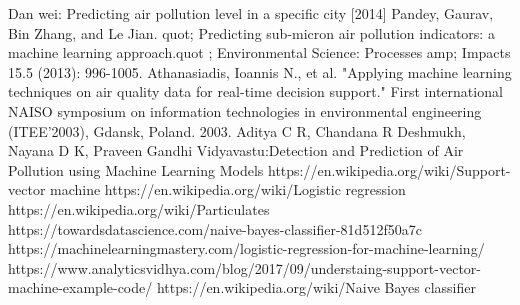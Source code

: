 \clearpage



\clearpage
{}
\begin{thebibliography}{99}
	
Dan wei: Predicting air pollution level in a specific city [2014]
Pandey, Gaurav, Bin Zhang, and Le Jian. quot; Predicting sub-micron air pollution indicators: a machine learning approach.quot ; Environmental Science: Processes  amp; Impacts 15.5 (2013): 996-1005.
Athanasiadis, Ioannis N., et al. "Applying machine learning techniques on air quality data for real-time decision support." First international NAISO symposium on information technologies in environmental engineering (ITEE'2003), Gdansk, Poland. 2003.
Aditya C R, Chandana R Deshmukh, Nayana D K, Praveen Gandhi Vidyavastu:Detection and Prediction of Air Pollution using Machine Learning Models
https://en.wikipedia.org/wiki/Support-vector machine
https://en.wikipedia.org/wiki/Logistic regression
https://en.wikipedia.org/wiki/Particulates
https://towardsdatascience.com/naive-bayes-classifier-81d512f50a7c
https://machinelearningmastery.com/logistic-regression-for-machine-learning/
https://www.analyticsvidhya.com/blog/2017/09/understaing-support-vector-machine-example-code/
https://en.wikipedia.org/wiki/Naive Bayes classifier

	
	
	








	
\end{thebibliography}



\clearpage





